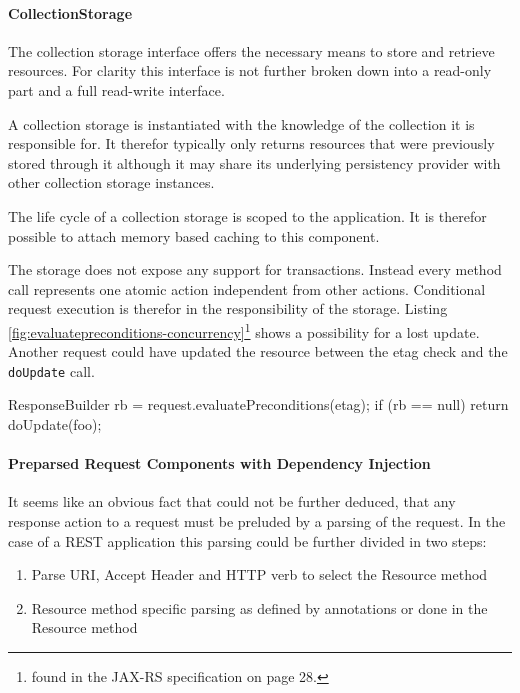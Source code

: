\documentclass[12pt,a4paper,twoside]{scrartcl}		%
\begin{document}
\paragraph{CollectionStorage}
\label{sec:collectionstorage}

The collection storage interface offers the necessary means to store and
retrieve resources. For clarity this interface is not further broken down into a
read-only part and a full read-write interface.

A collection storage is instantiated with the knowledge of the collection it is
responsible for. It therefor typically only returns resources that were
previously stored through it although it may share its underlying persistency
provider with other collection storage instances.

The life cycle of a collection storage is scoped to the application. It is
therefor possible to attach memory based caching to this component.

The storage does not expose any support for transactions. Instead every method
call represents one atomic action independent from other actions. Conditional
request execution is therefor in the responsibility of the storage. Listing
\ref{fig:evaluatepreconditions-concurrency}\footnote{found in the JAX-RS
  specification on page 28.} shows a possibility for a lost update. Another
request could have updated the resource between the etag check and the
\lstinline:doUpdate: call.

\begin{javalisting}[label=fig:evaluatepreconditions-concurrency,
                   caption={Potential lost-update problem with JAX-RS}]
ResponseBuilder rb = request.evaluatePreconditions(etag);
if (rb == null)
  return doUpdate(foo);
\end{javalisting}



\paragraph{Preparsed Request Components with Dependency Injection}
\label{sec:prep-requ-comp}

It seems like an obvious fact that could not be further deduced, that any
response action to a request must be preluded by a parsing of the request. In
the case of a REST application this parsing could be further divided in two
steps:
\begin{enumerate}
\item Parse URI, Accept Header and HTTP verb to select the Resource method
\item Resource method specific parsing as defined by annotations or done in the
  Resource method
\end{enumerate}
\end{document}
